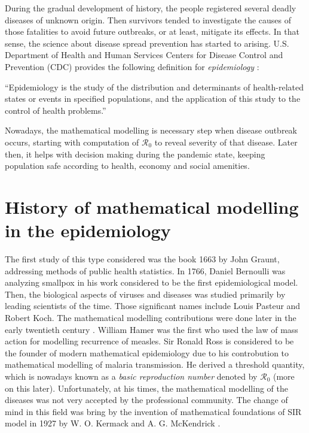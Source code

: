 \documentclass[
  digital, %
  oneside, %
  lof,     %
  lot,     %
]{fithesis4}
\begin{document}
During the gradual development of history,
the people registered several deadly diseases of unknown origin.
Then survivors tended to investigate the causes of those 
fatalities to avoid future outbreaks, or at least, mitigate its effects.
In that sense, the science about disease spread 
prevention has started to arising.
U.S. Department of Health and Human Services Centers 
for Disease Control and Prevention (CDC) provides the 
following definition for \textit{epidemiology} \cite{cdc2006}:

\begin{displayquote}
  ``Epidemiology is the study of the distribution and
  determinants of health-related states or events in specified
  populations, and the application of this study to the control
  of health problems.''
\end{displayquote}

Nowadays, the mathematical modelling is necessary 
step when disease outbreak occurs, starting with computation 
of $\mathcal{R}_0$ to reveal severity of that disease.
Later then, it helps with decision 
making during the pandemic state, keeping population safe 
according to health, economy and social amenities.
  


\section{History of mathematical modelling in the epidemiology}

The first study of this type considered was the book 1663 by 
John Graunt, addressing methods of public health statistics.
In 1766, Daniel Bernoulli was analyzing smallpox in his work 
considered to be the first epidemiological model.
Then, the biological aspects of viruses and diseases was 
studied primarily by leading scientists of the time.
Those significant names include Louis Pasteur and Robert Koch.
The mathematical modelling contributions were done later in
the early twentieth century \cite[Chapter~1.4]{martcheva2015}.
William Hamer was the first who used the law of 
mass action for modelling recurrence of measles. 
Sir Ronald Ross is considered to be the founder of 
modern mathematical epidemiology due to his controbution
to mathematical modelling of malaria
transmission. He derived a threshold quantity, which is 
nowadays known as a \textit{basic reproduction number}
denoted by $\mathcal{R}_0$ (more on this later).
Unfortunately, at his times, the mathematical modelling 
of the diseases was not very accepted by the professional community.
The change of mind in this field was bring by the invention 
of mathematical foundations of SIR model in 1927 by W. O. Kermack and 
A. G. McKendrick \cite{kermack1927}.
\end{document}
